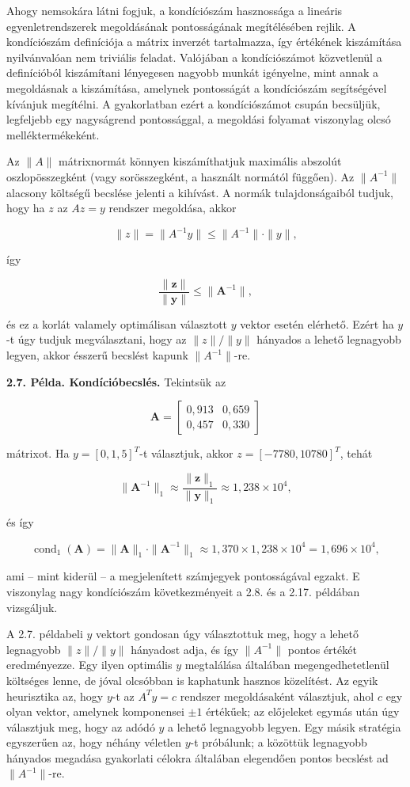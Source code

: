 \documentclass[
  magyar,
  11pt]{article}
\providecommand{\boldsymbol}[1]{\mathbf{#1}}
\begin{document}
Ahogy nemsokára látni fogjuk, a kondíciószám hasznossága a lineáris
egyenletrendszerek megoldásának pontosságának megítélésében rejlik. A
kondíciószám definíciója a mátrix inverzét tartalmazza, így értékének
kiszámítása nyilvánvalóan nem triviális feladat. Valójában a
kondíciószámot közvetlenül a definícióból kiszámítani lényegesen nagyobb
munkát igényelne, mint annak a megoldásnak a kiszámítása, amelynek
pontosságát a kondíciószám segítségével kívánjuk megítélni. A
gyakorlatban ezért a kondíciószámot csupán becsüljük, legfeljebb egy
nagyságrend pontossággal, a megoldási folyamat viszonylag olcsó
melléktermékeként.

Az \(\|A\|\) mátrixnormát könnyen kiszámíthatjuk maximális abszolút
oszlopösszegként (vagy sorösszegként, a használt normától függően). Az
\(\|A^{-1}\|\) alacsony költségű becslése jelenti a kihívást. A normák
tulajdonságaiból tudjuk, hogy ha \(z\) az \(Az = y\) rendszer megoldása,
akkor

\[\|z\| = \|A^{-1}y\| \le \|A^{-1}\| \cdot \|y\|,\]

így

\[\frac{\|\boldsymbol{z}\|}{\|\boldsymbol{y}\|} \le \|\boldsymbol{A}^{-1}\|,\]

és ez a korlát valamely optimálisan választott \(y\) vektor esetén
elérhető. Ezért ha \(y\)-t úgy tudjuk megválasztani, hogy az
\(\|z\|/\|y\|\) hányados a lehető legnagyobb legyen, akkor ésszerű
becslést kapunk \(\|A^{-1}\|\)-re.

\textbf{2.7. Példa. Kondícióbecslés.} Tekintsük az

\[\mathbf{A} = \begin{bmatrix} 0{,}913 & 0{,}659 \\ 0{,}457 & 0{,}330 \end{bmatrix}\]

mátrixot. Ha \(y = [0, 1{,}5]^T\)-t választjuk, akkor
\(z = [-7780, 10780]^T\), tehát

\[\|\boldsymbol{A}^{-1}\|_{1} \approx \frac{\|\boldsymbol{z}\|_{1}}{\|\boldsymbol{y}\|_{1}} \approx 1{,}238 \times 10^{4},\]

és így

\[\operatorname{cond}_1(\mathbf{A}) = \|\mathbf{A}\|_1 \cdot \|\mathbf{A}^{-1}\|_1 \approx 1{,}370 \times 1{,}238 \times 10^4 = 1{,}696 \times 10^4,\]

ami -- mint kiderül -- a megjelenített számjegyek pontosságával egzakt.
E viszonylag nagy kondíciószám következményeit a 2.8. és a 2.17.
példában vizsgáljuk.

A 2.7. példabeli \(y\) vektort gondosan úgy választottuk meg, hogy a
lehető legnagyobb \(\|z\|/\|y\|\) hányadost adja, és így \(\|A^{-1}\|\)
pontos értékét eredményezze. Egy ilyen optimális \(y\) megtalálása
általában megengedhetetlenül költséges lenne, de jóval olcsóbban is
kaphatunk hasznos közelítést. Az egyik heurisztika az, hogy \(y\)-t az
\(A^T y = c\) rendszer megoldásaként választjuk, ahol \(c\) egy olyan
vektor, amelynek komponensei \(\pm 1\) értékűek; az előjeleket egymás
után úgy választjuk meg, hogy az adódó \(y\) a lehető legnagyobb legyen.
Egy másik stratégia egyszerűen az, hogy néhány véletlen \(y\)-t
próbálunk; a közöttük legnagyobb hányados megadása gyakorlati célokra
általában elegendően pontos becslést ad \(\|A^{-1}\|\)-re.
\end{document}
